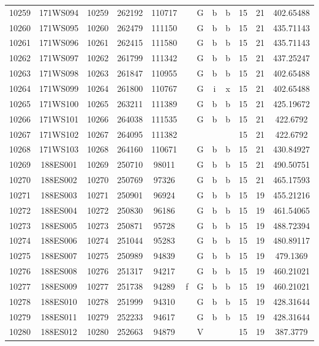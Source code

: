 \begin{tabular}{|*{12}{c|}}
10259 & 171WS094 & 10259 & 262192 & 110717 &  & G & b & b & 15 & 21 & 402.65488 \\ 
10260 & 171WS095 & 10260 & 262479 & 111150 &  & G & b & b & 15 & 21 & 435.71143 \\ 
10261 & 171WS096 & 10261 & 262415 & 111580 &  & G & b & b & 15 & 21 & 435.71143 \\ 
10262 & 171WS097 & 10262 & 261799 & 111342 &  & G & b & b & 15 & 21 & 437.25247 \\ 
10263 & 171WS098 & 10263 & 261847 & 110955 &  & G & b & b & 15 & 21 & 402.65488 \\ 
10264 & 171WS099 & 10264 & 261800 & 110767 &  & G & i & x & 15 & 21 & 402.65488 \\ 
10265 & 171WS100 & 10265 & 263211 & 111389 &  & G & b & b & 15 & 21 & 425.19672 \\ 
10266 & 171WS101 & 10266 & 264038 & 111535 &  & G & b & b & 15 & 21 & 422.6792 \\ 
10267 & 171WS102 & 10267 & 264095 & 111382 &  &  &  &  & 15 & 21 & 422.6792 \\ 
10268 & 171WS103 & 10268 & 264160 & 110671 &  & G & b & b & 15 & 21 & 430.84927 \\ 
10269 & 188ES001 & 10269 & 250710 & 98011 &  & G & b & b & 15 & 21 & 490.50751 \\ 
10270 & 188ES002 & 10270 & 250769 & 97326 &  & G & b & b & 15 & 21 & 465.17593 \\ 
10271 & 188ES003 & 10271 & 250901 & 96924 &  & G & b & b & 15 & 19 & 455.21216 \\ 
10272 & 188ES004 & 10272 & 250830 & 96186 &  & G & b & b & 15 & 19 & 461.54065 \\ 
10273 & 188ES005 & 10273 & 250871 & 95728 &  & G & b & b & 15 & 19 & 488.72394 \\ 
10274 & 188ES006 & 10274 & 251044 & 95283 &  & G & b & b & 15 & 19 & 480.89117 \\ 
10275 & 188ES007 & 10275 & 250989 & 94839 &  & G & b & b & 15 & 19 & 479.1369 \\ 
10276 & 188ES008 & 10276 & 251317 & 94217 &  & G & b & b & 15 & 19 & 460.21021 \\ 
10277 & 188ES009 & 10277 & 251738 & 94289 & f & G & b & b & 15 & 19 & 460.21021 \\ 
10278 & 188ES010 & 10278 & 251999 & 94310 &  & G & b & b & 15 & 19 & 428.31644 \\ 
10279 & 188ES011 & 10279 & 252233 & 94617 &  & G & b & b & 15 & 19 & 428.31644 \\ 
10280 & 188ES012 & 10280 & 252663 & 94879 &  & V &  &  & 15 & 19 & 387.3779 \\ 

\end{tabular}
